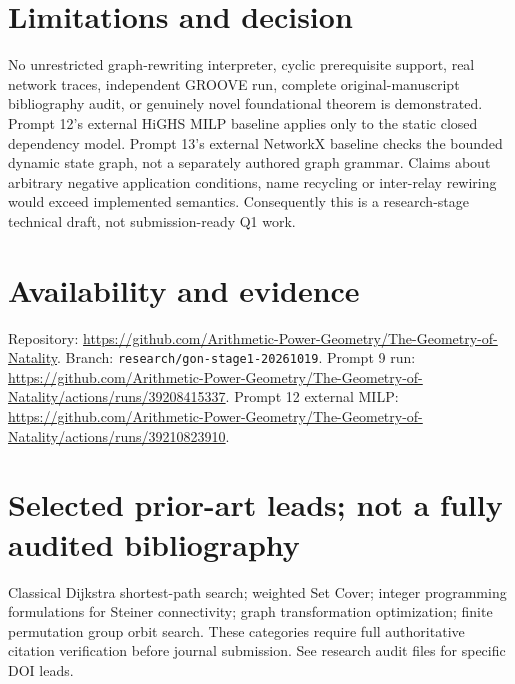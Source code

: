 \documentclass[10pt,a4paper]{article}
\begin{document}
\section{Limitations and decision}
No unrestricted graph-rewriting interpreter, cyclic prerequisite support, real network traces, independent GROOVE run, complete original-manuscript bibliography audit, or genuinely novel foundational theorem is demonstrated. Prompt 12's external HiGHS MILP baseline applies only to the static closed dependency model. Prompt 13's external NetworkX baseline checks the bounded dynamic state graph, not a separately authored graph grammar. Claims about arbitrary negative application conditions, name recycling or inter-relay rewiring would exceed implemented semantics. Consequently this is a research-stage technical draft, not submission-ready Q1 work.
\section*{Availability and evidence}
Repository: \url{https://github.com/Arithmetic-Power-Geometry/The-Geometry-of-Natality}. Branch: \texttt{research/gon-stage1-20261019}. Prompt 9 run: \url{https://github.com/Arithmetic-Power-Geometry/The-Geometry-of-Natality/actions/runs/39208415337}. Prompt 12 external MILP: \url{https://github.com/Arithmetic-Power-Geometry/The-Geometry-of-Natality/actions/runs/39210823910}.
\section*{Selected prior-art leads; not a fully audited bibliography}
Classical Dijkstra shortest-path search; weighted Set Cover; integer programming formulations for Steiner connectivity; graph transformation optimization; finite permutation group orbit search. These categories require full authoritative citation verification before journal submission. See research audit files for specific DOI leads.
\end{document}
